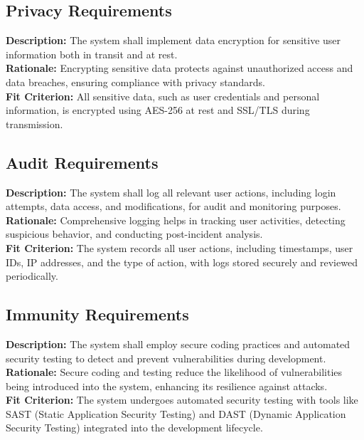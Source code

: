 \documentclass{article}
\begin{document}
\subsection{Privacy Requirements}
\begin{tcolorbox}[title=SEC-PRI1]
\textbf{Description:} The system shall implement data encryption for sensitive user information both in transit and at rest. \\
\textbf{Rationale:} Encrypting sensitive data protects against unauthorized access and data breaches, ensuring compliance with privacy standards. \\
\textbf{Fit Criterion:} All sensitive data, such as user credentials and personal information, is encrypted using AES-256 at rest and SSL/TLS during transmission.
\end{tcolorbox}



\subsection{Audit Requirements}
\begin{tcolorbox}[title=SEC-AUD1]
\textbf{Description:} The system shall log all relevant user actions, including login attempts, data access, and modifications, for audit and monitoring purposes. \\
\textbf{Rationale:} Comprehensive logging helps in tracking user activities, detecting suspicious behavior, and conducting post-incident analysis. \\
\textbf{Fit Criterion:} The system records all user actions, including timestamps, user IDs, IP addresses, and the type of action, with logs stored securely and reviewed periodically.
\end{tcolorbox}



\subsection{Immunity Requirements}
\begin{tcolorbox}[title=SEC-IMM1]
\textbf{Description:} The system shall employ secure coding practices and automated security testing to detect and prevent vulnerabilities during development. \\
\textbf{Rationale:} Secure coding and testing reduce the likelihood of vulnerabilities being introduced into the system, enhancing its resilience against attacks. \\
\textbf{Fit Criterion:} The system undergoes automated security testing with tools like SAST (Static Application Security Testing) and DAST (Dynamic Application Security Testing) integrated into the development lifecycle.
\end{tcolorbox}
\end{document}

